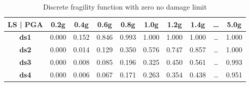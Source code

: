 \begin{table}[htbp]

\centering
\begin{tabular}{ c c c c c c c c c c }

\hline
\rowcolor{anti-flashwhite}
\bf{LS | PGA} & \bf{0.2g} & \bf{0.4g} & \bf{0.6g} & \bf{0.8g} & \bf{1.0g} & \bf{1.2g} & \bf{1.4g} & \bf{\dots} & \bf{5.0g} \\
\hline
\bf{ds1} & 0.000 & 0.152 & 0.846 & 0.993 & 1.000 & 1.000 & 1.000 & \dots & 1.000 \\
\bf{ds2} & 0.000 & 0.014 & 0.129 & 0.350 & 0.576 & 0.747 & 0.857 & \dots & 1.000 \\
\bf{ds3} & 0.000 & 0.008 & 0.085 & 0.196 & 0.325 & 0.450 & 0.561 & \dots & 0.993 \\
\bf{ds4} & 0.000 & 0.006 & 0.067 & 0.171 & 0.263 & 0.354 & 0.438 & \dots & 0.951 \\
\hline
\end{tabular}

\caption{Discrete fragility function with zero no damage limit}
\label{tab:ff-disc-tax1-zndl}
\end{table}
